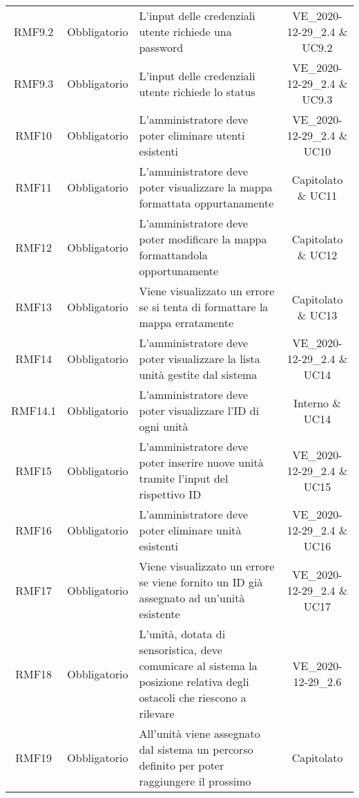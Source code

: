 \begin{longtable}[h!] { c c m{8cm} c}
		RMF9.2 & Obbligatorio & L'input delle credenziali utente richiede una password & VE\_2020-12-29\_2.4 \& UC9.2 \\

		RMF9.3 & Obbligatorio & L'input delle credenziali utente richiede lo status & VE\_2020-12-29\_2.4 \& UC9.3 \\

		RMF10 & Obbligatorio & L'amministratore deve poter eliminare utenti esistenti & VE\_2020-12-29\_2.4 \& UC10 \\

		RMF11 & Obbligatorio & L'amministratore deve poter visualizzare la mappa formattata oppurtanamente & Capitolato \& UC11 \\

		RMF12 & Obbligatorio & L'amministratore deve poter modificare la mappa formattandola opportunamente & Capitolato \& UC12 \\

		RMF13 & Obbligatorio & Viene visualizzato un errore se si tenta di formattare la mappa erratamente & Capitolato \& UC13 \\

		RMF14 & Obbligatorio & L'amministratore deve poter visualizzare la lista unità gestite dal sistema & VE\_2020-12-29\_2.4 \& UC14 \\

		RMF14.1 & Obbligatorio & L'amministratore deve poter visualizzare l'ID di ogni unità & Interno \& UC14 \\

		RMF15 & Obbligatorio & L'amministratore deve poter inserire nuove unità tramite l'input del rispettivo ID & VE\_2020-12-29\_2.4 \& UC15 \\

		RMF16& Obbligatorio & L'amministratore deve poter eliminare unità esistenti & VE\_2020-12-29\_2.4 \& UC16 \\

		RMF17 & Obbligatorio & Viene visualizzato un errore se viene fornito un ID già assegnato ad un'unità esistente & VE\_2020-12-29\_2.4 \& UC17 \\

		RMF18 & Obbligatorio & L'unità, dotata di sensoristica, deve comunicare al sistema la posizione relativa degli ostacoli che riescono a rilevare & VE\_2020-12-29\_2.6 \\

		RMF19 & Obbligatorio & All'unità viene assegnato dal sistema un percorso definito per poter raggiungere il prossimo \glock{POI} & Capitolato \\


\end{longtable}

